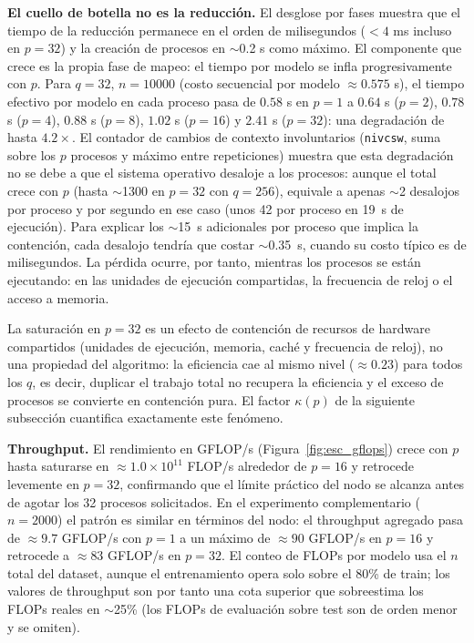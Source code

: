 \documentclass[11pt, a4paper]{article}
\begin{document}
\textbf{El cuello de botella no es la reducción.} El desglose por fases muestra que el tiempo de la reducción permanece en el orden de milisegundos ($< 4$ ms incluso en $p = 32$) y la creación de procesos en $\sim$0.2 s como máximo. El componente que crece es la propia fase de mapeo: el tiempo por modelo se infla progresivamente con $p$. Para $q = 32$, $n = 10000$ (costo secuencial por modelo $\approx 0.575$ s), el tiempo efectivo por modelo en cada proceso pasa de $0.58$ s en $p = 1$ a $0.64$ s ($p=2$), $0.78$ s ($p=4$), $0.88$ s ($p=8$), $1.02$ s ($p=16$) y $2.41$ s ($p=32$): una degradación de hasta $4.2\times$. El contador de cambios de contexto involuntarios (\texttt{nivcsw}, suma sobre los $p$ procesos y máximo entre repeticiones) muestra que esta degradación no se debe a que el sistema operativo desaloje a los procesos: aunque el total crece con $p$ (hasta $\sim$1300 en $p = 32$ con $q = 256$), equivale a apenas $\sim$2 desalojos por proceso y por segundo en ese caso (unos 42 por proceso en 19~s de ejecución). Para explicar los $\sim$15~s adicionales por proceso que implica la contención, cada desalojo tendría que costar $\sim$0.35~s, cuando su costo típico es de milisegundos. La pérdida ocurre, por tanto, mientras los procesos se están ejecutando: en las unidades de ejecución compartidas, la frecuencia de reloj o el acceso a memoria.

La saturación en $p = 32$ es un efecto de contención de recursos de hardware compartidos (unidades de ejecución, memoria, caché y frecuencia de reloj), no una propiedad del algoritmo: la eficiencia cae al mismo nivel ($\approx 0.23$) para todos los $q$, es decir, duplicar el trabajo total no recupera la eficiencia y el exceso de procesos se convierte en contención pura. El factor $\kappa(p)$ de la siguiente subsección cuantifica exactamente este fenómeno.

\textbf{Throughput.} El rendimiento en GFLOP/s (Figura~\ref{fig:esc_gflops}) crece con $p$ hasta saturarse en $\approx 1.0 \times 10^{11}$ FLOP/s alrededor de $p = 16$ y retrocede levemente en $p = 32$, confirmando que el límite práctico del nodo se alcanza antes de agotar los 32 procesos solicitados. En el experimento complementario ($n = 2000$) el patrón es similar en términos del nodo: el throughput agregado pasa de $\approx 9.7$ GFLOP/s con $p = 1$ a un máximo de $\approx 90$ GFLOP/s en $p = 16$ y retrocede a $\approx 83$ GFLOP/s en $p = 32$. El conteo de FLOPs por modelo usa el $n$ total del dataset, aunque el entrenamiento opera solo sobre el 80\% de train; los valores de throughput son por tanto una cota superior que sobreestima los FLOPs reales en $\sim$25\% (los FLOPs de evaluación sobre test son de orden menor y se omiten).
\end{document}

